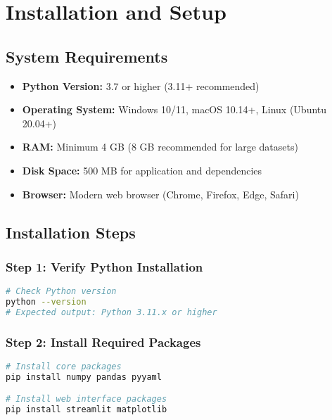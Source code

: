 \documentclass[11pt,a4paper]{article}
\begin{document}
\newpage

\section{Installation and Setup}

\subsection{System Requirements}

\begin{itemize}[leftmargin=*]
    \item \textbf{Python Version:} 3.7 or higher (3.11+ recommended)
    \item \textbf{Operating System:} Windows 10/11, macOS 10.14+, Linux (Ubuntu 20.04+)
    \item \textbf{RAM:} Minimum 4 GB (8 GB recommended for large datasets)
    \item \textbf{Disk Space:} 500 MB for application and dependencies
    \item \textbf{Browser:} Modern web browser (Chrome, Firefox, Edge, Safari)
\end{itemize}

\subsection{Installation Steps}

\subsubsection{Step 1: Verify Python Installation}

\begin{lstlisting}[style=bashstyle, language=bash]
# Check Python version
python --version
# Expected output: Python 3.11.x or higher
\end{lstlisting}

\subsubsection{Step 2: Install Required Packages}

\begin{lstlisting}[style=bashstyle, language=bash]
# Install core packages
pip install numpy pandas pyyaml

# Install web interface packages
pip install streamlit matplotlib
\end{lstlisting}
\end{document}
